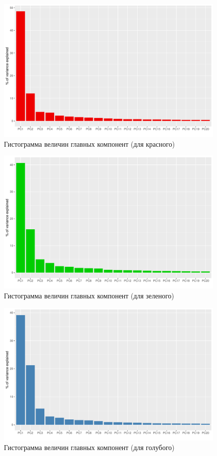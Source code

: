 \documentclass[a4paper]{article}
\begin{document}
\begin{figure}[H]
    \centering
    \includegraphics[width = \textwidth]{hists/Redhist_for_Austria.pdf}
    \caption{Гистограмма величин главных компонент (для красного)}
    \label{fig:aus_r}
\end{figure}
\begin{figure}[H]
    \centering
    \includegraphics[width = \textwidth]{hists/Greenhist_for_Austria.pdf}
    \caption{Гистограмма величин главных компонент (для зеленого)}
    \label{fig:aus_g}
\end{figure}
\begin{figure}[H]
    \centering
    \includegraphics[width = \textwidth]{hists/Bluehist_for_Austria.pdf}
    \caption{Гистограмма величин главных компонент (для голубого)}
    \label{fig:aus_b}
\end{figure}
\end{document}
